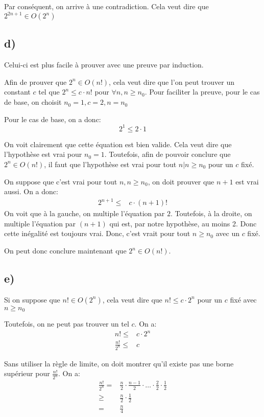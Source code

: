 \documentclass[10pt,a4paper]{article}
\begin{document}
Par conséquent, on arrive à une contradiction. Cela veut dire que $2^{2n+1} \in O(2^n)$
\subsection{d)}
Celui-ci est plus facile à prouver avec une preuve par induction. 

Afin de prouver que $2^n \in O(n!)$, cela veut dire que l'on peut trouver un constant $c$ tel que $2^n \leq c \cdot n!$ pour $\forall n, n \geq n_0$. Pour faciliter la preuve, pour le cas de base, on choisit $n_0 = 1, c = 2, n = n_0$

Pour le cas de base, on a donc:
\begin{equation*}
    2^1 \leq 2 \cdot 1 
\end{equation*}

On voit clairement que cette équation est bien valide. Cela veut dire que l'hypothèse est vrai pour $n_0 = 1$. Toutefois, afin de pouvoir conclure que $2^n \in O(n!)$, il faut que l'hypothèse est vrai pour tout $n | n \geq n_0$ pour un $c$ fixé.

On suppose que c'est vrai pour tout $n, n \geq n_0$, on doit prouver que $n+1$ est vrai aussi. On a donc:
\begin{align*}
    2^{n+1} \leq& c \cdot (n+1)!
\end{align*}
On voit que à la gauche, on multiple l'équation par $2$. Toutefois, à la droite, on multiple l'équation par $(n+1)$ qui est, par notre hypothèse, au moins 2. Donc cette inégalité est toujours vrai. Donc, c'est vrait pour tout $n \geq n_0$ avec un $c$ fixé.

On peut donc conclure maintenant que $2^n \in O(n!)$.
\subsection{e)}

Si on suppose que $n! \in O(2^n)$, cela veut dire que $n! \leq c \cdot 2^n$ pour un $c$ fixé avec $n \geq n_0$

Toutefois, on ne peut pas trouver un tel $c$. On a:
\begin{align*}
    n! \leq& c \cdot 2^n \\
    \frac{n!}{2^n} \leq& c
\end{align*}

Sans utiliser la règle de limite, on doit montrer qu'il existe pas une borne supérieur pour $\frac{n!}{2^n}$. On a:
\begin{align*}
    \frac{n!}{2^n} =& \frac{n}{2} \cdot \frac{n-1}{2} \cdot \dots \cdot \frac{2}{2} \cdot \frac{1}{2} \\
    \geq& \frac{n}{2} \cdot \frac{1}{2} \\
    =& \frac{n}{4}
\end{align*}
\end{document}
